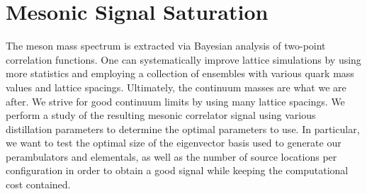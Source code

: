 
\chapter{Mesonic Signal Saturation}\label{sec:signal}
The meson mass spectrum is extracted via Bayesian analysis of two-point correlation functions. One can systematically improve lattice simulations by using more statistics and employing a collection of ensembles with various quark mass values and lattice spacings. Ultimately, the continuum masses are what we are after. We strive for good continuum limits by using many lattice spacings.
We perform a study of the resulting mesonic correlator signal using various distillation parameters to determine the optimal parameters to use. In particular, we want to test the optimal size of the eigenvector basis used to generate our perambulators and elementals, as well as the number of source locations per configuration in order to obtain a good signal while keeping the computational cost contained. 



